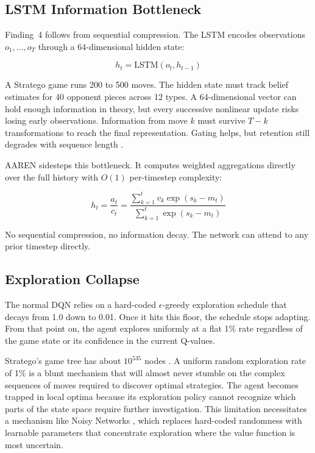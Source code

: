 \subsection{LSTM Information Bottleneck}

Finding~4 follows from sequential compression. The LSTM encodes observations $o_1, \ldots, o_T$ through a 64-dimensional hidden state:

\begin{equation}
h_t = \text{LSTM}(o_t, h_{t-1})
\end{equation}

A Stratego game runs 200 to 500 moves. The hidden state must track belief estimates for 40 opponent pieces across 12 types. A 64-dimensional vector can hold enough information in theory, but every successive nonlinear update risks losing early observations. Information from move $k$ must survive $T - k$ transformations to reach the final representation. Gating helps, but retention still degrades with sequence length \cite{Aaren}.

AAREN sidesteps this bottleneck. It computes weighted aggregations directly over the full history with $O(1)$ per-timestep complexity:

\begin{equation}
h_t = \frac{a_t}{c_t} = \frac{\sum_{k=1}^{t} v_k \exp(s_k - m_t)}{\sum_{k=1}^{t} \exp(s_k - m_t)}
\end{equation}

No sequential compression, no information decay. The network can attend to any prior timestep directly.

\subsection{Exploration Collapse}

The normal DQN relies on a hard-coded $\epsilon$-greedy exploration schedule that decays from 1.0 down to 0.01. Once it hits this floor, the schedule stops adapting. From that point on, the agent explores uniformly at a flat 1\% rate regardless of the game state or its confidence in the current Q-values.

Stratego's game tree has about $10^{535}$ nodes \cite{perolat2022stratego}. A uniform random exploration rate of 1\% is a blunt mechanism that will almost never stumble on the complex sequences of moves required to discover optimal strategies. The agent becomes trapped in local optima because its exploration policy cannot recognize which parts of the state space require further investigation. This limitation necessitates a mechanism like Noisy Networks \cite{RainbowJMLR2021}, which replaces hard-coded randomness with learnable parameters that concentrate exploration where the value function is most uncertain.

